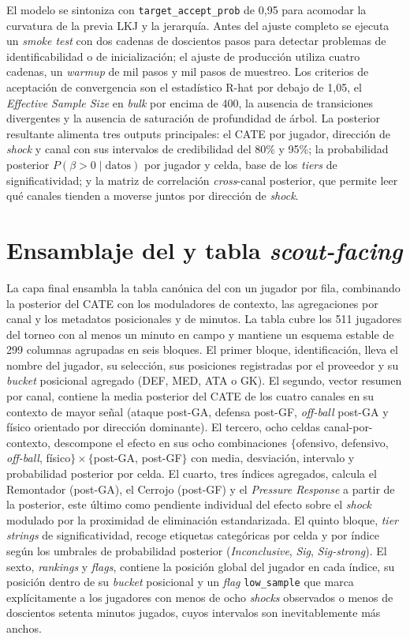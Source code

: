 El modelo se sintoniza con \texttt{target\_accept\_prob} de 0{,}95
para acomodar la curvatura de la previa LKJ y la jerarquía. Antes
del ajuste completo se ejecuta un \textit{smoke test} con dos
cadenas de doscientos pasos para detectar problemas de
identificabilidad o de inicialización; el ajuste de producción
utiliza cuatro cadenas, un \textit{warmup} de mil pasos y mil pasos
de muestreo. Los criterios de aceptación de convergencia son el
estadístico R-hat por debajo de 1{,}05, el \textit{Effective Sample
Size} en \textit{bulk} por encima de 400, la ausencia de transiciones
divergentes y la ausencia de saturación de profundidad de árbol. La
posterior resultante alimenta tres outputs principales: el CATE por
jugador, dirección de \textit{shock} y canal con sus intervalos de
credibilidad del 80\% y 95\%; la probabilidad posterior
$P(\beta > 0 \mid \text{datos})$ por jugador y celda, base de los
\textit{tiers} de significatividad; y la matriz de correlación
\textit{cross}-canal posterior, que permite leer qué canales tienden
a moverse juntos por dirección de \textit{shock}.


\section{Ensamblaje del \CCV{} y tabla \textit{scout-facing}}
\label{sec:ccv-ensamblaje}

La capa final ensambla la tabla canónica del \CCV con un jugador por
fila, combinando la posterior del CATE con los moduladores de
contexto, las agregaciones por canal y los metadatos posicionales y
de minutos. La tabla cubre los 511 jugadores del torneo con al menos
un minuto en campo y mantiene un esquema estable de 299 columnas
agrupadas en seis bloques. El primer bloque, identificación, lleva el
nombre del jugador, su selección, sus posiciones registradas por el
proveedor y su \textit{bucket} posicional agregado (DEF, MED, ATA o
GK). El segundo, vector resumen por canal, contiene la media
posterior del CATE de los cuatro canales en su contexto de mayor
señal (ataque post-GA, defensa post-GF, \textit{off-ball} post-GA
y físico orientado por dirección dominante). El tercero, ocho celdas
canal-por-contexto, descompone el efecto en sus ocho combinaciones
$\{$ofensivo, defensivo, \textit{off-ball}, físico$\} \times
\{$post-GA, post-GF$\}$ con media, desviación, intervalo y probabilidad
posterior por celda. El cuarto, tres índices agregados, calcula el
Remontador (post-GA), el Cerrojo (post-GF) y el \textit{Pressure
Response} a partir de la posterior, este último como pendiente
individual del efecto sobre el \textit{shock} modulado por la
proximidad de eliminación estandarizada. El quinto bloque,
\textit{tier strings} de significatividad, recoge etiquetas
categóricas por celda y por índice según los umbrales de probabilidad
posterior (\textit{Inconclusive}, \textit{Sig}, \textit{Sig-strong}).
El sexto, \textit{rankings} y \textit{flags}, contiene la posición
global del jugador en cada índice, su posición dentro de su
\textit{bucket} posicional y un \textit{flag} \texttt{low\_sample}
que marca explícitamente a los jugadores con menos de ocho
\textit{shocks} observados o menos de doscientos setenta minutos
jugados, cuyos intervalos son inevitablemente más anchos.

